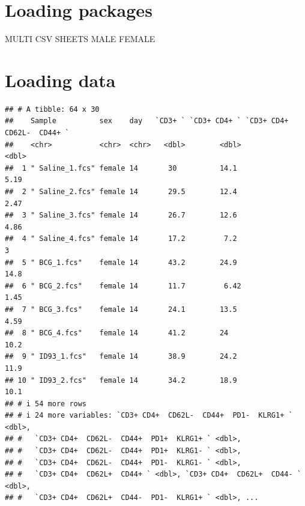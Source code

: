 \documentclass[
]{book}
\begin{document}
\section{Loading packages}\label{loading-packages}

MULTI CSV SHEETS MALE FEMALE

\section{Loading data}\label{loading-data}

\begin{verbatim}
## # A tibble: 64 x 30
##    Sample          sex    day   `CD3+ ` `CD3+ CD4+ ` `CD3+ CD4+  CD62L-  CD44+ `
##    <chr>           <chr>  <chr>   <dbl>        <dbl>                       <dbl>
##  1 " Saline_1.fcs" female 14       30          14.1                         5.19
##  2 " Saline_2.fcs" female 14       29.5        12.4                         2.47
##  3 " Saline_3.fcs" female 14       26.7        12.6                         4.86
##  4 " Saline_4.fcs" female 14       17.2         7.2                         3   
##  5 " BCG_1.fcs"    female 14       43.2        24.9                        14.8 
##  6 " BCG_2.fcs"    female 14       11.7         6.42                        1.45
##  7 " BCG_3.fcs"    female 14       24.1        13.5                         4.59
##  8 " BCG_4.fcs"    female 14       41.2        24                          10.2 
##  9 " ID93_1.fcs"   female 14       38.9        24.2                        11.9 
## 10 " ID93_2.fcs"   female 14       34.2        18.9                        10.1 
## # i 54 more rows
## # i 24 more variables: `CD3+ CD4+  CD62L-  CD44+  PD1-  KLRG1+ ` <dbl>,
## #   `CD3+ CD4+  CD62L-  CD44+  PD1+  KLRG1+ ` <dbl>,
## #   `CD3+ CD4+  CD62L-  CD44+  PD1+  KLRG1- ` <dbl>,
## #   `CD3+ CD4+  CD62L-  CD44+  PD1-  KLRG1- ` <dbl>,
## #   `CD3+ CD4+  CD62L+  CD44+ ` <dbl>, `CD3+ CD4+  CD62L+  CD44- ` <dbl>,
## #   `CD3+ CD4+  CD62L+  CD44-  PD1-  KLRG1+ ` <dbl>, ...
\end{verbatim}
\end{document}
